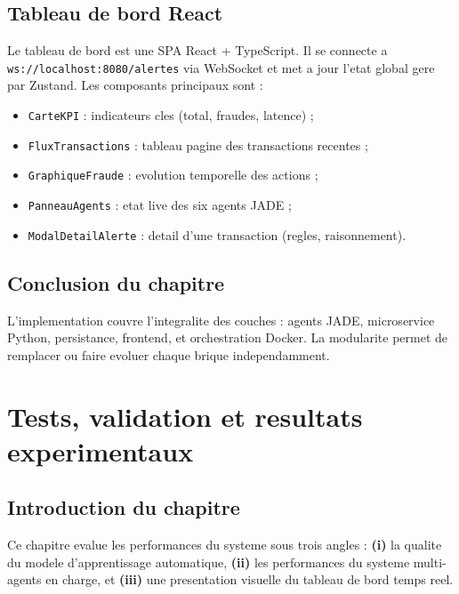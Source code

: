 \documentclass[12pt,a4paper,oneside]{report}
\begin{document}
\section{Tableau de bord React}

Le tableau de bord est une SPA React + TypeScript. Il se connecte a
\texttt{ws://localhost:8080/alertes} via WebSocket et met a jour l'etat
global gere par Zustand. Les composants principaux sont :

\begin{itemize}[leftmargin=*]
  \item \texttt{CarteKPI} : indicateurs cles (total, fraudes, latence) ;
  \item \texttt{FluxTransactions} : tableau pagine des transactions
        recentes ;
  \item \texttt{GraphiqueFraude} : evolution temporelle des actions ;
  \item \texttt{PanneauAgents} : etat live des six agents JADE ;
  \item \texttt{ModalDetailAlerte} : detail d'une transaction (regles,
        raisonnement).
\end{itemize}

\section{Conclusion du chapitre}
L'implementation couvre l'integralite des couches : agents JADE, microservice
Python, persistance, frontend, et orchestration Docker. La modularite permet
de remplacer ou faire evoluer chaque brique independamment.

\chapter{Tests, validation et resultats experimentaux}

\section{Introduction du chapitre}
Ce chapitre evalue les performances du systeme sous trois angles :
\textbf{(i)} la qualite du modele d'apprentissage automatique,
\textbf{(ii)} les performances du systeme multi-agents en charge, et
\textbf{(iii)} une presentation visuelle du tableau de bord temps reel.
\end{document}
